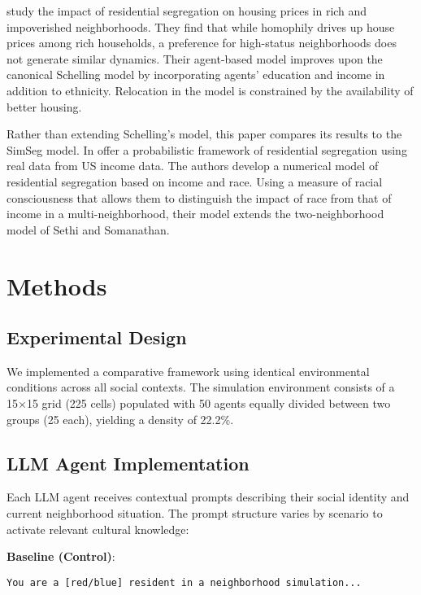 \documentclass[pdflatex,sn-basic]{sn-jnl}%
\begin{document}
\citet{bonakdar2023dissimilarity} study the impact of residential segregation on housing prices in rich and impoverished neighborhoods. They find that while homophily drives up house prices among rich households, a preference for high-status neighborhoods does not generate similar dynamics. 
Their agent-based model improves upon the canonical Schelling model by incorporating agents' education and income in addition to ethnicity. Relocation in the model is constrained by the availability of better housing.

Rather than extending Schelling’s model, this paper compares its results to the SimSeg model. In \citet{li2020racial} offer a probabilistic framework of residential segregation using real data from US income data. The authors develop a numerical model of residential segregation based on income and race. Using a measure of racial consciousness that allows them to distinguish the impact of race from that of income in a multi-neighborhood, their model extends the two-neighborhood model of Sethi and Somanathan. 



\section{Methods}\label{methods}

\subsection{Experimental Design}\label{experimental-design}

We implemented a comparative framework using identical environmental
conditions across all social contexts. The simulation environment
consists of a 15×15 grid (225 cells) populated with 50 agents equally
divided between two groups (25 each), yielding a density of 22.2\%.

\subsection{LLM Agent Implementation}\label{llm-agent-implementation}

Each LLM agent receives contextual prompts describing their social
identity and current neighborhood situation. The prompt structure varies
by scenario to activate relevant cultural knowledge:

\textbf{Baseline (Control)}:
\begin{verbatim}
You are a [red/blue] resident in a neighborhood simulation...
\end{verbatim}
\end{document}
